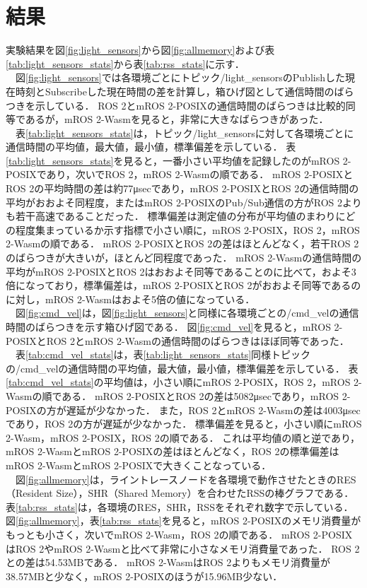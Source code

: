 \section{結果}
実験結果を図\ref{fig:light_sensors}から図\ref{fig:allmemory}および表\ref{tab:light_sensors_stats}から表\ref{tab:rss_stats}に示す．
\\　図\ref{fig:light_sensors}では各環境ごとにトピック/light\_sensorsのPublishした現在時刻とSubscribeした現在時間の差を計算し，箱ひげ図として通信時間のばらつきを示している．
ROS 2とmROS 2-POSIXの通信時間のばらつきは比較的同等であるが，mROS 2-Wasmを見ると，非常に大きなばらつきがあった．
\\　表\ref{tab:light_sensors_stats}は，トピック/light\_sensorsに対して各環境ごとに通信時間の平均値，最大値，最小値，標準偏差を示している．
表\ref{tab:light_sensors_stats}を見ると，一番小さい平均値を記録したのがmROS 2-POSIXであり，次いでROS 2，mROS 2-Wasmの順である．
mROS 2-POSIXとROS 2の平均時間の差は約77μsecであり，mROS 2-POSIXとROS 2の通信時間の平均がおおよそ同程度，またはmROS 2-POSIXのPub/Sub通信の方がROS 2よりも若干高速であることだった．
標準偏差は測定値の分布が平均値のまわりにどの程度集まっているか示す指標で小さい順に，mROS 2-POSIX，ROS 2，mROS 2-Wasmの順である．
mROS 2-POSIXとROS 2の差はほとんどなく，若干ROS 2のばらつきが大きいが，ほとんど同程度であった．
mROS 2-Wasmの通信時間の平均がmROS 2-POSIXとROS 2はおおよそ同等であることのに比べて，およそ3倍になっており，標準偏差は，mROS 2-POSIXとROS 2がおおよそ同等であるのに対し，mROS 2-Wasmはおよそ5倍の値になっている．
\\　図\ref{fig:cmd_vel}は，図\ref{fig:light_sensors}と同様に各環境ごとの/cmd\_velの通信時間のばらつきを示す箱ひげ図である．
図\ref{fig:cmd_vel}を見ると，mROS 2-POSIXとROS 2とmROS 2-Wasmの通信時間のばらつきはほぼ同等であった．
\\　表\ref{tab:cmd_vel_stats}は，表\ref{tab:light_sensors_stats}同様トピックの/cmd\_velの通信時間の平均値，最大値，最小値，標準偏差を示している．
表\ref{tab:cmd_vel_stats}の平均値は，小さい順にmROS 2-POSIX，ROS 2，mROS 2-Wasmの順である．
mROS 2-POSIXとROS 2の差は5082μsecであり，mROS 2-POSIXの方が遅延が少なかった．
また，ROS 2とmROS 2-Wasmの差は4003μsecであり，ROS 2の方が遅延が少なかった．
標準偏差を見ると，小さい順にmROS 2-Wasm，mROS 2-POSIX，ROS 2の順である．
これは平均値の順と逆であり，mROS 2-WasmとmROS 2-POSIXの差はほとんどなく，ROS 2の標準偏差はmROS 2-WasmとmROS 2-POSIXで大きくことなっている．
\\　図\ref{fig:allmemory}は，ライントレースノードを各環境で動作させたときのRES（Resident Size），SHR（Shared Memory）を合わせたRSSの棒グラフである．
表\ref{tab:rss_stats}は，各環境のRES，SHR，RSSをそれぞれ数字で示している．
図\ref{fig:allmemory}，表\ref{tab:rss_stats}を見ると，mROS 2-POSIXのメモリ消費量がもっとも小さく，次いでmROS 2-Wasm，ROS 2の順である．
mROS 2-POSIXはROS 2やmROS 2-Wasmと比べて非常に小さなメモリ消費量であった．
ROS 2との差は54.53MBである．
mROS 2-WasmはROS 2よりもメモリ消費量が38.57MBと少なく，mROS 2-POSIXのほうが15.96MB少ない．
